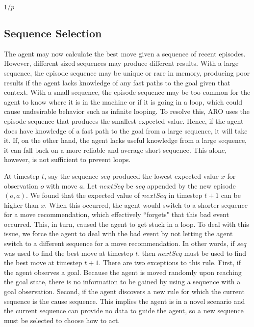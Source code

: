 \documentclass[letterpaper]{article} %
\begin{document}
\begin{algorithmic}[-1]
	
		\State \Return $1/p$
	\EndFunction
	
\end{algorithmic}

\subsection{Sequence Selection}

The agent may now calculate the best move given a sequence of recent episodes. However, different sized sequences may produce different results. With a large sequence, the episode sequence may be unique or rare in memory, producing poor results if the agent lacks knowledge of any fast paths to the goal given that context. With a small sequence, the episode sequence may be too common for the agent to know where it is in the machine or if it is going in a loop, which could cause undesirable behavior such as infinite looping. To resolve this, ARO uses the episode sequence that produces the smallest expected value. Hence, if the agent does have knowledge of a fast path to the goal from a large sequence, it will take it. If, on the other hand, the agent lacks useful knowledge from a large sequence, it can fall back on a more reliable and average short sequence. This alone, however, is not sufficient to prevent loops.

At timestep $t$, say the sequence $seq$ produced the lowest expected value $x$ for observation $o$ with move $a$. Let $nextSeq$ be $seq$ appended by the new episode $(o, a)$. We found that the expected value of $nextSeq$ in timestep $t+ 1$ can be higher than $x$. When this occurred, the agent would switch to a shorter sequence for a move recommendation, which effectively ``forgets" that this bad event occurred. This, in turn, caused the agent to get stuck in a loop. To deal with this issue, we force the agent to deal with the bad event by not letting the agent switch to a different sequence for a move recommendation. In other words, if $seq$ was used to find  the best move at timestep $t$, then $nextSeq$ must be used to find the best move at timestep $t+1$. There are two exceptions to this rule. First, if the agent observes a goal. Because the agent is moved randomly upon reaching the goal state, there is no information to be gained by using a sequence with a goal observation. Second, if the agent discovers a new rule for which the current sequence is the cause sequence. This implies the agent is in a novel scenario and the current sequence can provide no data to guide the agent, so a new sequence must be selected to choose how to act.
\end{document}
